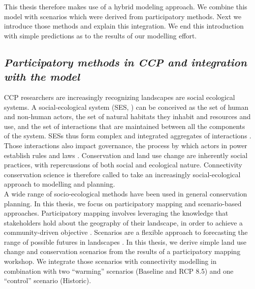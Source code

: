 \documentclass[12pt,Bold,TexShade]{thesis/mcgilletdclass}
\begin{document}
{This thesis therefore makes use of a hybrid modeling approach. We combine this model with scenarios which were derived from participatory methods. Next we introduce those methods and explain this integration. We end this introduction with simple predictions as to the results of our modelling effort. \\ \vspace{2em}

\subsection*{\textit{Participatory methods in CCP and integration with the model \\ \vspace{1em}}}

CCP researchers are increasingly recognizing landscapes are social ecological systems. A social-ecological system (SES, \cite{ostrom_general_2009}) can be conceived  as the set of human and non-human actors, the set of natural habitats they inhabit and resources and use, and the set of interactions that are maintained between all the components of the system. SESs thus form complex and integrated aggregates of interactions \citep{hinkel_enhancing_2014}. Those interactions also impact governance, the process by which actors in power establish rules and laws \citep{bissonnette_comparing_2018}. Conservation and land use change are inherently social practices, with repercussions of both social and ecological nature. Connectivity conservation science is therefore called to take an increasingly social-ecological approach to modelling and planning. \\

A wide range of socio-ecological methods have been used in general conservation planning. In this thesis, we focus on participatory mapping and scenario-based approaches. Participatory mapping involves leveraging the knowledge that stakeholders hold about the geography of their landscape, in order to achieve a community-driven objective  \citep{plieninger_assessing_2013}. Scenarios are a flexible approach to forecasting the range of possible futures in landscapes \citep{peterson_scenario_2003}. In this thesis, we derive simple land use change and conservation scenarios from the results of a participatory mapping workshop. We integrate those scenarios with connectivity modelling in combination with two “warming” scenarios (Baseline and RCP 8.5) and one “control” scenario (Historic). \\

}
\end{document}
